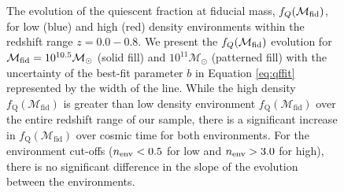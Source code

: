 \documentclass{emulateapj}
\begin{document}
\begin{figure}
    \begin{center}
        \leavevmode
        \caption{The evolution of the quiescent fraction at fiducial
          mass, $f_{Q}(\mathcal{M}_{\rm{fid}})$, for low (blue) and
          high (red) density environments within the redshift range $z
          = 0.0 - 0.8$. We present the $f_{Q}(\mathcal{M}_{\rm{fid}})$
          evolution for $\mathcal{M}_{\rm{fid}} = 10^{10.5}
          \mathcal{M}_\odot$ (solid fill) and $10^{11}
          \mathcal{M}_\odot$ (patterned fill) with the uncertainty of
          the best-fit parameter $b$ in Equation \ref{eq:qffit}
          represented by the width of the line. While the high density $f_{\mathrm{Q}}(\mathcal{M}_{\mathrm{fid}})$ is greater than low density environment $f_{\mathrm{Q}}(\mathcal{M}_{\mathrm{fid}})$ over the entire redshift range of our sample, there is a significant increase in $f_{\mathrm{Q}}(\mathcal{M}_{\mathrm{fid}})$ over cosmic time for both environments. For the environment cut-offs ($n_{\rm{env}} < 0.5$ for low and $n_{\rm{env}} > 3.0$ for high), there is no significant difference in the slope of the evolution between the environments.}         \label{fig:qffit}
    \end{center}
\end{figure}
\end{document}
